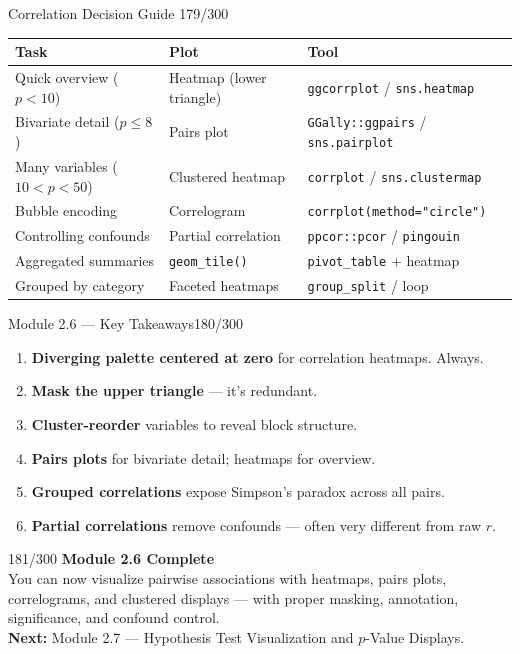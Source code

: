 \documentclass[10pt]{beamer}
\newcommand{\smark}[1]{\hfill{\scriptsize\color{codegray}#1}}
\begin{document}
\begin{frame}{Correlation Decision Guide}
\smark{179/300}
\centering\small
\begin{tabular}{@{}lll@{}}
    \toprule
    \textbf{Task} & \textbf{Plot} & \textbf{Tool} \\
    \midrule
    Quick overview ($p < 10$)     & Heatmap (lower triangle) & \texttt{ggcorrplot} / \texttt{sns.heatmap} \\
    Bivariate detail ($p \leq 8$) & Pairs plot               & \texttt{GGally::ggpairs} / \texttt{sns.pairplot} \\
    Many variables ($10 < p < 50$)& Clustered heatmap        & \texttt{corrplot} / \texttt{sns.clustermap} \\
    Bubble encoding               & Correlogram              & \texttt{corrplot(method="circle")} \\
    Controlling confounds          & Partial correlation      & \texttt{ppcor::pcor} / \texttt{pingouin} \\
    Aggregated summaries           & \texttt{geom\_tile()}    & \texttt{pivot\_table} + heatmap \\
    Grouped by category            & Faceted heatmaps         & \texttt{group\_split} / loop \\
    \bottomrule
\end{tabular}
\end{frame}

\begin{frame}{Module 2.6 --- Key Takeaways}\smark{180/300}
\begin{enumerate}
    \item \textbf{Diverging palette centered at zero} for correlation heatmaps. Always.
    \item \textbf{Mask the upper triangle} --- it's redundant.
    \item \textbf{Cluster-reorder} variables to reveal block structure.
    \item \textbf{Pairs plots} for bivariate detail; heatmaps for overview.
    \item \textbf{Grouped correlations} expose Simpson's paradox across all pairs.
    \item \textbf{Partial correlations} remove confounds --- often very different from raw $r$.
\end{enumerate}
\end{frame}

\begin{frame}{}\smark{181/300}
\centering\vspace{1.5cm}
{\Large\textbf{Module 2.6 Complete}}\\[0.5cm]
You can now visualize pairwise associations with heatmaps, pairs plots, correlograms, and clustered displays --- with proper masking, annotation, significance, and confound control.\\[0.5cm]
\textbf{Next:} Module 2.7 --- Hypothesis Test Visualization and $p$-Value Displays.
\end{frame}
\end{document}
